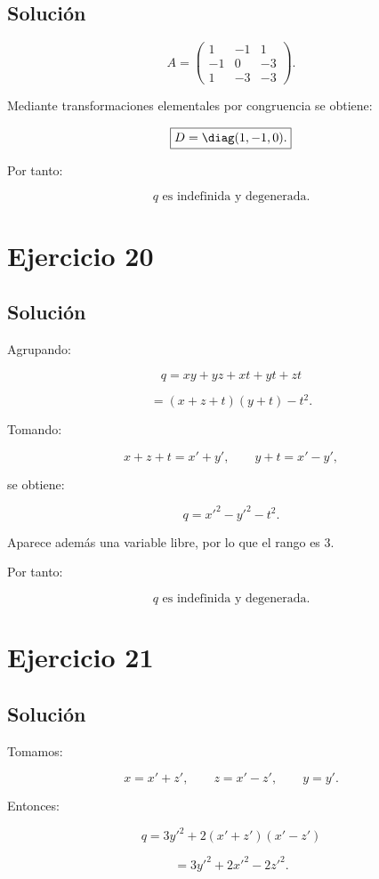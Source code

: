 \documentclass[11pt,a4paper]{article}
\begin{document}
\subsection{Solución}

\[
A=
\begin{pmatrix}
1&-1&1\\
-1&0&-3\\
1&-3&-3
\end{pmatrix}.
\]

Mediante transformaciones elementales por congruencia se obtiene:

\[
\boxed{
D=
\diag(1,-1,0).
}
\]

Por tanto:

\[
\boxed{
q\text{ es indefinida y degenerada}.
}
\]

\section{Ejercicio 20}
\subsection{Solución}

Agrupando:

\[
q
=
xy+yz+xt+yt+zt
\]

\[
=
(x+z+t)(y+t)-t^2.
\]

Tomando:

\[
x+z+t=x'+y',
\qquad
y+t=x'-y',
\]

se obtiene:

\[
\boxed{
q=x'^2-y'^2-t^2.
}
\]

Aparece además una variable libre, por lo que el rango es $3$.

Por tanto:

\[
\boxed{
q\text{ es indefinida y degenerada}.
}
\]

\section{Ejercicio 21}
\subsection{Solución}

Tomamos:

\[
x=x'+z',
\qquad
z=x'-z',
\qquad
y=y'.
\]

Entonces:

\[
q
=
3y'^2+2(x'+z')(x'-z')
\]

\[
=
3y'^2+2x'^2-2z'^2.
\]
\end{document}
